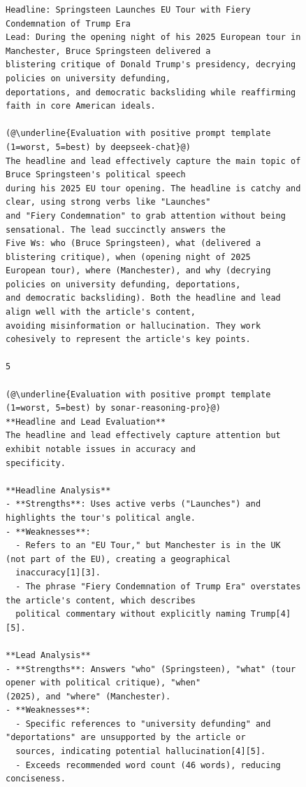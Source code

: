 \documentclass[UTF8,noindent,nohyp,parspace,titlepage,a4paper,12pt]{article}
\begin{document}
    \begin{figure}[!hbtp]
      \begin{lstlisting}[basicstyle=\fontsize{7pt}{8pt}\selectfont\sffamily,frame=single,linewidth=\textwidth]
Headline: Springsteen Launches EU Tour with Fiery Condemnation of Trump Era
Lead: During the opening night of his 2025 European tour in Manchester, Bruce Springsteen delivered a
blistering critique of Donald Trump's presidency, decrying policies on university defunding,
deportations, and democratic backsliding while reaffirming faith in core American ideals.

(@\underline{Evaluation with positive prompt template (1=worst, 5=best) by deepseek-chat}@)
The headline and lead effectively capture the main topic of Bruce Springsteen's political speech
during his 2025 EU tour opening. The headline is catchy and clear, using strong verbs like "Launches"
and "Fiery Condemnation" to grab attention without being sensational. The lead succinctly answers the
Five Ws: who (Bruce Springsteen), what (delivered a blistering critique), when (opening night of 2025
European tour), where (Manchester), and why (decrying policies on university defunding, deportations,
and democratic backsliding). Both the headline and lead align well with the article's content,
avoiding misinformation or hallucination. They work cohesively to represent the article's key points.

5

(@\underline{Evaluation with positive prompt template (1=worst, 5=best) by sonar-reasoning-pro}@)
**Headline and Lead Evaluation**
The headline and lead effectively capture attention but exhibit notable issues in accuracy and
specificity.

**Headline Analysis**
- **Strengths**: Uses active verbs ("Launches") and highlights the tour's political angle.
- **Weaknesses**:
  - Refers to an "EU Tour," but Manchester is in the UK (not part of the EU), creating a geographical
  inaccuracy[1][3].
  - The phrase "Fiery Condemnation of Trump Era" overstates the article's content, which describes
  political commentary without explicitly naming Trump[4][5].

**Lead Analysis**
- **Strengths**: Answers "who" (Springsteen), "what" (tour opener with political critique), "when"
(2025), and "where" (Manchester).
- **Weaknesses**:
  - Specific references to "university defunding" and "deportations" are unsupported by the article or
  sources, indicating potential hallucination[4][5].
  - Exceeds recommended word count (46 words), reducing conciseness.


\end{lstlisting}
\end{figure}
\end{document}
